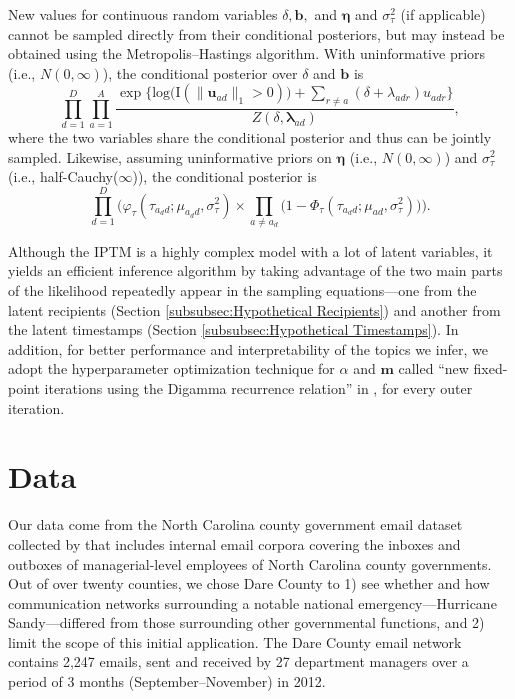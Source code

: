 \documentclass{article}
\begin{document}
  	   New values for continuous random variables $\delta, \boldsymbol{b},$ and $\boldsymbol{\eta}$ and $\sigma^2_\tau$ (if applicable) cannot be sampled directly from their conditional posteriors, but may instead be obtained using the Metropolis--Hastings algorithm. With uninformative priors (i.e., $N({0},\infty)$), the conditional posterior over $\delta$ and $\boldsymbol{b}$ is
  	   \begin{equation}
\prod_{d=1}^D
\prod_{a=1}^A \frac{\exp\Big\{\mbox{log}\big(\text{I}( \lVert \boldsymbol{u}_{ad}\rVert_1 > 0)\big) + \sum\limits_{r \neq a} (\delta+\lambda_{adr})u_{adr}\Big\}}{Z(\delta,\boldsymbol{\lambda}_{ad})},
\end{equation}
where the two variables share the conditional posterior and thus can be jointly sampled. Likewise, assuming uninformative priors on $\boldsymbol{\eta}$ (i.e., $N({0},\infty)$) and $\sigma_{\tau}^2$ (i.e., half-Cauchy($\infty$)), the conditional posterior is
\begin{equation}
\prod_{d=1}^D\Big(\varphi_{\tau}(\tau_{a_d d}; \mu_{a_d d}, \sigma_\tau^2)\times \prod_{a\neq a_d}\big(1-\Phi_{\tau}(\tau_{a_d d}; \mu_{a d}, \sigma_\tau^2) \big)\Big).
\end{equation}

Although the IPTM is a highly complex model with a lot of latent variables, it yields an efficient inference algorithm by taking advantage of the two main parts of the likelihood  repeatedly appear in the sampling equations---one from the latent recipients (Section \ref{subsubsec:Hypothetical Recipients}) and another from the latent timestamps (Section \ref{subsubsec:Hypothetical Timestamps}). In addition, for better performance and interpretability of the topics we infer, we adopt the hyperparameter optimization technique for $\alpha$ and $\boldsymbol{m}$ called ``new fixed-point iterations using the Digamma recurrence relation'' in \cite{wallach2008structured}, for every outer iteration. 

\section{Data}\label{sec:Data}
Our data come from the North Carolina county government email dataset collected by \cite{ben2017transparency} that includes internal email corpora covering the inboxes and outboxes of managerial-level employees of North Carolina county governments. Out of over twenty counties, we chose Dare County to 1) see whether and how communication networks surrounding a notable national emergency---Hurricane Sandy---differed from those surrounding other governmental functions, and 2) limit the scope of this initial application. The Dare County email network contains 2,247 emails, sent and received by 27 department managers over a period of 3 months (September--November) in 2012. 
\end{document}
